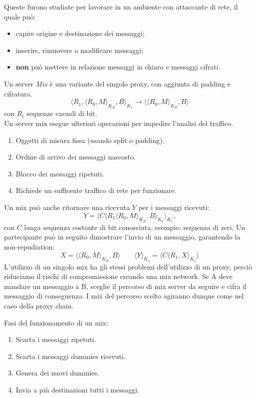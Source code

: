 \documentclass[a4paper, 11pt, twoside, openright, fleqn]{report}
\begin{document}
Queste furono studiate per lavorare in un ambiente con attaccante di rete, il quale può:
\begin{itemize}
	\item capire origine e destinazione dei messaggi;
	\item inserire, rimuovere o modificare messaggi;
	\item \textbf{non} può mettere in relazione messaggi in chiaro e messaggi cifrati.
\end{itemize}
Un server \emph{Mix} è una variante del singolo proxy, con aggiunta di padding e cifratura.
\begin{equation*}
	\langle R_1, \langle R_0,M\rangle_{K_B},B\rangle_{K_1} \rightarrow \langle\langle R_0,M\rangle_{K_B},B\rangle
\end{equation*}
con $R_i$ sequenze casuali di bit.\\
Un server mix esegue ulteriori operazioni per impedire l'analisi del traffico.
\begin{enumerate}
	\item Oggetti di misura fissa (usando split o padding).
	\item Ordine di arrivo dei messaggi nascosto.
	\item Blocco dei messaggi ripetuti.
	\item Richiede un sufficente traffico di rete per funzionare.
\end{enumerate}
Un mix può anche ritornare una ricevuta $Y$ per i messaggi ricevuti:
\begin{equation*}
	Y = \langle C \langle R_1 \langle R_0, M\rangle_{K_B}, B \rangle_{K_1} \rangle_{K_1^{-1}}
\end{equation*}
con $C$ lunga sequenza costante di bit conosciuta, esempio: sequenza di zeri.
Un partecipante può in seguito dimostrare l'invio di un messaggio, garantendo la non-repudiation:
\begin{equation*}
	X = \langle\langle R_0, M\rangle_{K_B}, B \rangle \qquad \langle Y\rangle_{K_1} = \langle C \langle R_1, X \rangle_{K_1} \rangle
\end{equation*}
L'utilizzo di un singolo mix ha gli stessi problemi dell'utilizzo di un proxy, perciò riduciamo il rischi di compromissione creando una mix network. Se A deve mandare un messaggio a B, sceglie il percorso di mix server da seguire e cifra il messaggio di conseguenza. I mix del percorso scelto agiranno dunque come nel caso della proxy chain.

\noindent
Fasi del funzionamento di un mix:
\begin{enumerate}
	\item Scarta i messaggi ripetuti.
	\item Scarta i messaggi dummies ricevuti.
	\item Genera dei nuovi dummies.
	\item Invia a più destinazioni tutti i messaggi.
\end{enumerate}
\end{document}
